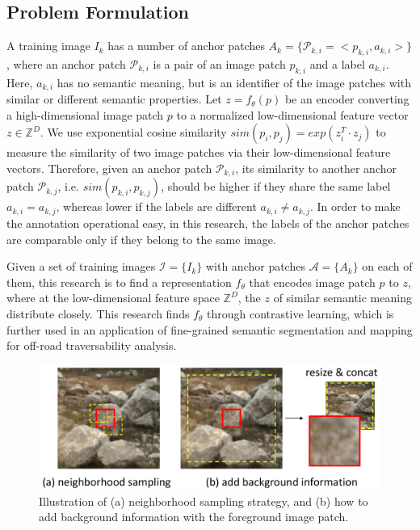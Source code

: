\documentclass[letterpaper, 10 pt, conference]{ieeeconf}  %
\begin{document}
	\subsection{Problem Formulation}
	
	A training image $I_k$ has a number of anchor patches $A_k=\{\mathcal{P}_{k,i}=<p_{k,i},a_{k,i}>\}$, where an anchor patch $\mathcal{P}_{k,i}$ is a pair of an image patch $p_{k,i}$ and a label $a_{k,i}$. Here, $a_{k,i}$ has no semantic meaning, but is an identifier of the image patches with similar or different semantic properties.
	Let $z=f_{\theta}(p)$ be an encoder converting a high-dimensional image patch $p$ to a normalized low-dimensional feature vector $z\in \mathbb{Z}^D$. 
	We use exponential cosine similarity $sim(p_i,p_j)=exp(z_i^T \cdot z_j)$ to measure the similarity of two image patches via their low-dimensional feature vectors.
	Therefore, given an anchor patch $\mathcal{P}_{k,i}$, its similarity to another anchor patch $\mathcal{P}_{k,j}$, i.e. $sim(p_{k,i},p_{k,j})$, should be higher if they share the same label $a_{k,i}=a_{k,j}$, whereas lower if the labels are different $a_{k,i} \neq a_{k,j}$.
	In order to make the annotation operational easy, in this research, the labels of the anchor patches are comparable only if they belong to the same image.
	
	Given a set of training images $\mathcal{I}=\{I_k\}$ with anchor patches $\mathcal{A}=\{A_k\}$ on each of them, this research is to find a representation $f_{\theta}$ that encodes image patch $p$ to $z$, where at the low-dimensional feature space $\mathbb{Z}^D$, the $z$ of similar semantic meaning distribute closely. 
	This research finds $f_{\theta}$ through contrastive learning, which is further used in an application of fine-grained semantic segmentation and mapping for off-road traversability analysis.
	
	\begin{figure}[]
		\centering
		\includegraphics[scale=0.23]{dataaug.pdf}
		\caption{Illustration of (a) neighborhood sampling strategy, and (b) how to add background information with the foreground image patch.}
		\label{fig:dataaug}
	\end{figure}
	
\end{document}
